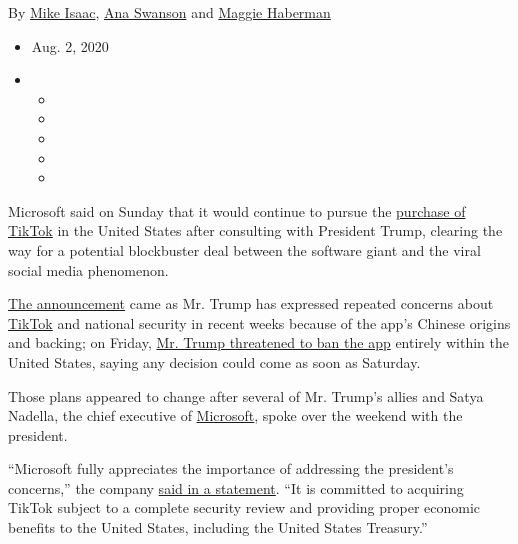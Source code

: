 By \href{https://www.nytimes3xbfgragh.onion/by/mike-isaac}{Mike Isaac},
\href{https://www.nytimes3xbfgragh.onion/by/ana-swanson}{Ana Swanson}
and \href{https://www.nytimes3xbfgragh.onion/by/maggie-haberman}{Maggie
Haberman}

\begin{itemize}
\item
  Aug. 2, 2020
\item
  \begin{itemize}
  \item
  \item
  \item
  \item
  \item
  \end{itemize}
\end{itemize}

Microsoft said on Sunday that it would continue to pursue the
\href{https://www.nytimes3xbfgragh.onion/2020/08/03/technology/tiktok-microsoft-tweens.html}{purchase
of TikTok} in the United States after consulting with President Trump,
clearing the way for a potential blockbuster deal between the software
giant and the viral social media phenomenon.

\href{https://blogs.microsoft.com/blog/2020/08/02/microsoft-to-continue-discussions-on-potential-tiktok-purchase-in-the-united-states/}{The
announcement} came as Mr. Trump has expressed repeated concerns about
\href{https://www.nytimes3xbfgragh.onion/2020/08/03/technology/trump-tiktok-microsoft.html}{TikTok}
and national security in recent weeks because of the app's Chinese
origins and backing; on Friday,
\href{https://www.nytimes3xbfgragh.onion/2020/08/02/style/tiktok-ban-threat-trump.html}{Mr.
Trump threatened to ban the app} entirely within the United States,
saying any decision could come as soon as Saturday.

Those plans appeared to change after several of Mr. Trump's allies and
Satya Nadella, the chief executive of
\href{https://www.nytimes3xbfgragh.onion/2020/08/03/us/navy-seal-museum-kaepernick.html}{Microsoft},
spoke over the weekend with the president.

``Microsoft fully appreciates the importance of addressing the
president's concerns,'' the company
\href{https://blogs.microsoft.com/blog/2020/08/02/microsoft-to-continue-discussions-on-potential-tiktok-purchase-in-the-united-states/}{said
in a statement}. ``It is committed to acquiring TikTok subject to a
complete security review and providing proper economic benefits to the
United States, including the United States Treasury.''

